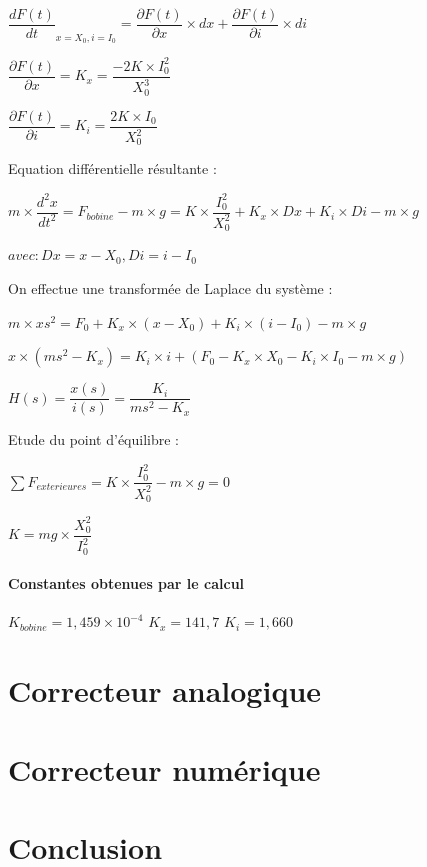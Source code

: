 \documentclass[11pt, french]{article} %
\begin{document}
$ {\dfrac{dF(t)}{dt}}_{x = X_0, i = I_0} = \dfrac{\partial F(t)}{\partial x} \times dx + \dfrac{\partial F(t)}{\partial i} \times di $

$ \dfrac{\partial F(t)}{\partial x} = K_x = \dfrac{-2K \times I_0^2}{X_0^3} $

$ \dfrac{\partial F(t)}{\partial i} = K_i = \dfrac{2K \times I_0}{X_0^2} $

Equation différentielle résultante :
\newline

$ m \times {\dfrac{{d^2}x}{dt^2}} = F_{bobine} - m \times g = K \times {\dfrac{I_0^2}{X_0^2}} + K_x \times Dx + K_i \times Di - m \times g $

$ avec : Dx = x - X_0, Di = i - I_0 $

On effectue une transformée de Laplace du système :
\newline

$ m \times x{s^2} = F_0 + K_x \times (x - X_0) + K_i \times (i - I_0) - m \times g $

$ x \times (m{s^2} - K_x) = K_i \times i +(F_0 - K_x \times X_0 - K_i \times I_0 - m \times g) $

$ H(s) = \dfrac{x(s)}{i(s)} = \dfrac{K_i}{m{s^2}- K_x}  $

Etude du point d'équilibre :
\newline

$ \sum F_{exterieures}  = K \times {\dfrac{I_0^2}{X_0^2}} - m \times g = 0 $

$ K = mg \times {\dfrac{X_0^2}{I_0^2}} $

\paragraph{Constantes obtenues par le calcul}

$ K_{bobine} = 1,459 \times 10^{-4} $
$ K_x = 141,7 $
$ K_i = 1,660 $

\section{Correcteur analogique}



\section{Correcteur numérique}
\section{Conclusion}
\end{document}
